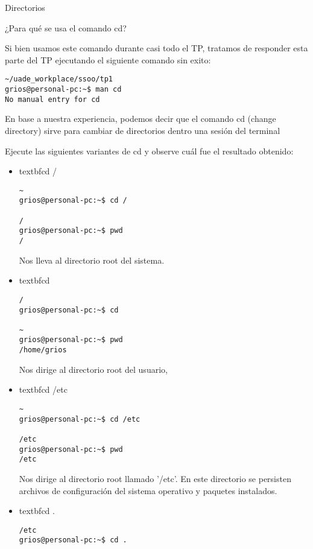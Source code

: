 \begin{section}{Directorios}

\begin{quoting}
¿Para qué se usa el comando cd?
\end{quoting}

Si bien usamos este comando durante casi todo el TP, tratamos de responder esta parte del TP ejecutando el siguiente comando sin exito:

\begin{lstlisting}[style=Ubuntu]
~/uade_workplace/ssoo/tp1
grios@personal-pc:~$ man cd
No manual entry for cd

\end{lstlisting}

En base a nuestra experiencia, podemos decir que el comando cd (change directory) sirve para cambiar de directorios dentro una sesión del terminal\\

\begin{quoting}
Ejecute las siguientes variantes de cd y observe cuál fue el resultado
obtenido:
\end{quoting}

\begin{itemize}
\item textbf{cd /}

\begin{lstlisting}[style=Ubuntu]
~
grios@personal-pc:~$ cd /

/
grios@personal-pc:~$ pwd
/
\end{lstlisting}
Nos lleva al directorio root del sistema.

\item textbf{cd}
\begin{lstlisting}[style=Ubuntu]
/
grios@personal-pc:~$ cd 

~
grios@personal-pc:~$ pwd
/home/grios
\end{lstlisting}
Nos dirige al directorio root del usuario,

\item textbf{cd /etc}
\begin{lstlisting}[style=Ubuntu]
~
grios@personal-pc:~$ cd /etc

/etc
grios@personal-pc:~$ pwd
/etc
\end{lstlisting}
Nos dirige al directorio root llamado '/etc'. En este directorio se persisten archivos de configuración del sistema operativo y paquetes instalados.

\item textbf{cd .}
\begin{lstlisting}[style=Ubuntu]
/etc
grios@personal-pc:~$ cd .


\end{lstlisting}
\end{itemize}
\end{section}
